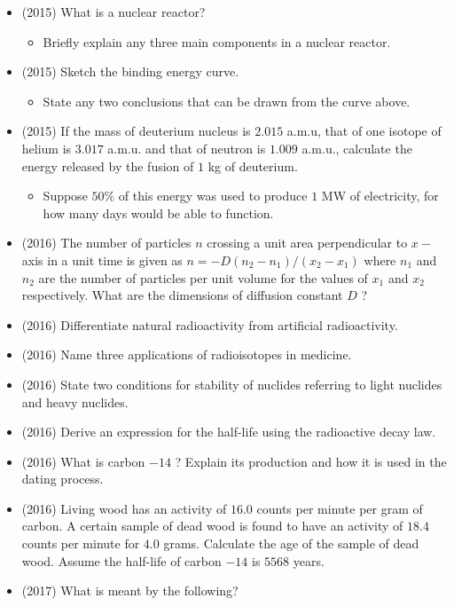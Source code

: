 \documentclass{article}
\begin{document}
\begin{itemize}
\item (2015)  What is a nuclear reactor?
 \begin{itemize}
\item Briefly explain any three main components in a nuclear reactor.
\end{itemize}
\item (2015)  Sketch the binding energy curve.
 \begin{itemize}
\item State any two conclusions that can be drawn from the curve above.
\end{itemize}
\item (2015)  If the mass of deuterium nucleus is $ 2.015$ a.m.u, that of one isotope of helium is $ 3.017$ a.m.u. and that of neutron is $ 1.009$ a.m.u., calculate the energy released by the fusion of $ 1$ kg of deuterium. 
 \begin{itemize}
\item Suppose $ 50\%$ of this energy was used to produce $ 1$ MW of electricity, for how many days would be able to function.
\end{itemize}
\item (2016)  The number of particles $ n$ crossing a unit area perpendicular to $ x-$ axis in a unit time is given as $ n=-D(n_{2}-n_{1})/(x_{2}-x_{1})$ where $ n_{1}$ and $ n_{2}$ are the number of particles per unit volume for the values of $ x_{1}$ and $ x_{2}$ respectively.  What are the dimensions of diffusion constant $ D$ ?
\item (2016)  Differentiate natural radioactivity from artificial radioactivity.
\item (2016)  Name three applications of radioisotopes in medicine.
\item (2016)  State two conditions for stability of nuclides referring to light nuclides and heavy nuclides.
\item (2016)  Derive an expression for the half-life using the radioactive decay law.
\item (2016)  What is carbon $ -14$ ?  Explain its production and how it is used in the dating process.
\item (2016)  Living wood has an activity of $ 16.0$ counts per minute per gram of carbon.  A certain sample of dead wood is found to have an activity of $ 18.4$ counts per minute for $ 4.0$ grams.  Calculate the age of the sample of dead wood.  Assume the half-life of carbon $ -14$ is $ 5568$ years.
\item (2017)  What is meant by the following?

\end{itemize}
\end{document}
